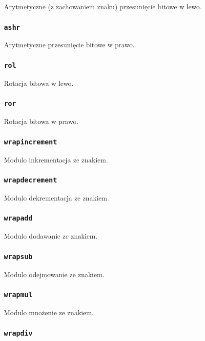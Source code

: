 Arytmetyczne (z zachowaniem znaku) przesunięcie bitowe w lewo.

\subsubsection{\texttt{ashr}}

Arytmetyczne przesunięcie bitowe w prawo.

\subsubsection{\texttt{rol}}

Rotacja bitowa w lewo.

\subsubsection{\texttt{ror}}

Rotacja bitowa w prawo.

\subsubsection{\texttt{wrapincrement}}

Modulo inkrementacja ze znakiem.

\subsubsection{\texttt{wrapdecrement}}

Modulo dekrementacja ze znakiem.

\subsubsection{\texttt{wrapadd}}

Modulo dodawanie ze znakiem.

\subsubsection{\texttt{wrapsub}}

Modulo odejmowanie ze znakiem.

\subsubsection{\texttt{wrapmul}}

Modulo mnożenie ze znakiem.

\subsubsection{\texttt{wrapdiv}}

